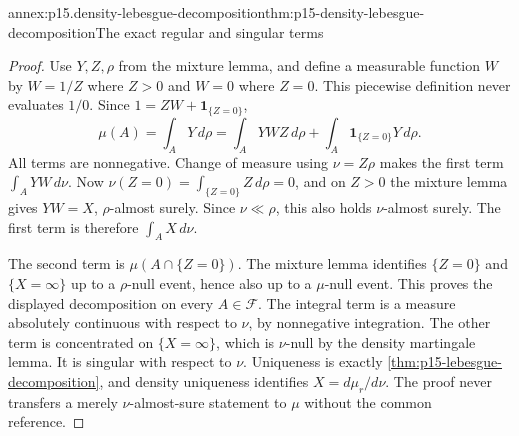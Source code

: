 \begin{annexitem}{annex:p15.density-lebesgue-decomposition}{thm:p15-density-lebesgue-decomposition}{The exact regular and singular terms}
\begin{proof}
Use \(Y,Z,\rho\) from the mixture lemma, and define a measurable function
\(W\) by \(W=1/Z\) where \(Z>0\) and \(W=0\) where \(Z=0\).
This piecewise definition never evaluates \(1/0\).
Since \(1=ZW+\mathbf1_{\{Z=0\}}\),
\[
 \mu(A)=\int_A Y\,d\rho
       =\int_A YWZ\,d\rho+\int_A\mathbf1_{\{Z=0\}}Y\,d\rho.
\]
All terms are nonnegative. Change of measure using \(\nu=Z\rho\)
makes the first term \(\int_A YW\,d\nu\).
Now \(\nu(Z=0)=\int_{\{Z=0\}}Z\,d\rho=0\), and on \(Z>0\)
the mixture lemma gives \(YW=X\), \(\rho\)-almost surely.
Since \(\nu\ll\rho\), this also holds \(\nu\)-almost surely.
The first term is therefore \(\int_A X\,d\nu\).

The second term is \(\mu(A\cap\{Z=0\})\).
The mixture lemma identifies \(\{Z=0\}\) and \(\{X=\infty\}\)
up to a \(\rho\)-null event, hence also up to a \(\mu\)-null event.
This proves the displayed decomposition on every \(A\in\mathcal F\).
The integral term is a measure absolutely continuous with respect to
\(\nu\), by nonnegative integration. The other term is concentrated on
\(\{X=\infty\}\), which is \(\nu\)-null by the density martingale lemma.
It is singular with respect to \(\nu\).
Uniqueness is exactly \cref{thm:p15-lebesgue-decomposition}, and density
uniqueness identifies \(X=d\mu_r/d\nu\).
The proof never transfers a merely \(\nu\)-almost-sure statement to
\(\mu\) without the common reference.
\end{proof}
\end{annexitem}

